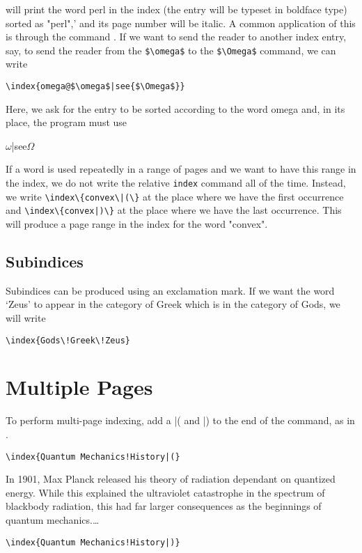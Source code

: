 \begin{multicols}{2}
will print the word perl in the index (the entry will be typeset in boldface type) sorted
as "perl",’ and its page number will be italic. A common application of this is through
the command . If we want to send the reader to another index entry, say, to send
the reader from the \verb+$\omega$+ to the \verb+$\Omega$+ command, we can write

\verb+\index{omega@$\omega$|see{$\Omega$}}+


Here, we ask for the entry to be sorted according to the word omega and, in its place,
the program must use 

\begin{teX}
$\omega$|see{$\Omega$}
\end{teX}

If a word is used repeatedly in a range of pages and we want to have this range
in the index, we do not write the relative \texttt{index} command all of the time. Instead,
we write \verb+\index\{convex\|(\}+  at the place where we have the first occurrence and
\verb+\index\{convex|)\}+  at the place where we have the last occurrence. This will produce a
page range in the index for the word "convex".

\subsection{Subindices}
Subindices can be produced using an exclamation mark. If we want the word `Zeus'
to appear in the category of Greek which is in the category of Gods, we will write

\verb+\index{Gods\!Greek\!Zeus}+


\section{Multiple Pages}

To perform multi-page indexing, add a |( and |) to the end of the \cmd{\index} command, as in 
.

{\small
\verb+\index{Quantum Mechanics!History|(}+

\narrower\narrower
In 1901, Max Planck released his theory of radiation dependant 
on quantized energy. While this explained the ultraviolet catastrophe
 in the spectrum of blackbody radiation, this had far larger consequences 
as the beginnings of quantum mechanics.\ldots

\verb+\index{Quantum Mechanics!History|)}+
}

\end{multicols}

